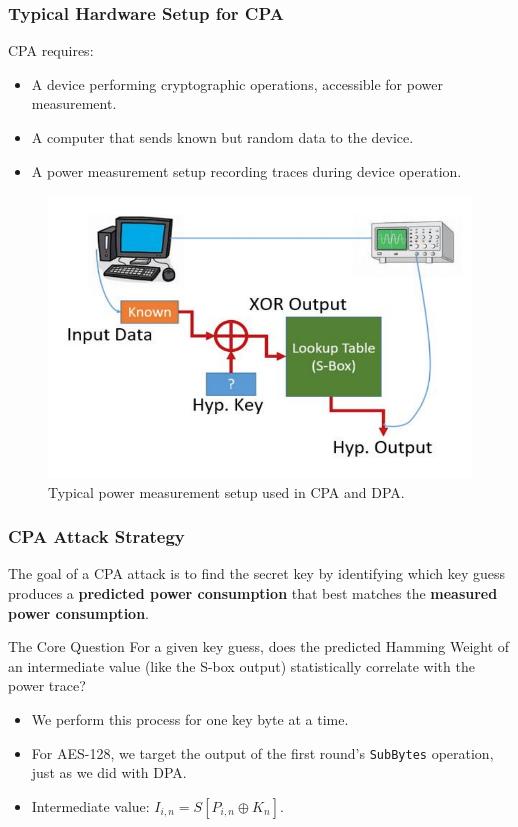 \begin{frame}
    \frametitle{Typical Hardware Setup for CPA}

    CPA requires:

    \begin{itemize}
        \item A device performing cryptographic operations, accessible for power measurement.
        \item A computer that sends known but random data to the device.
        \item A power measurement setup recording traces during device operation.
    \end{itemize}

    \begin{figure}
        \centering
        \includegraphics[width=0.7\linewidth]{main thing/Pictures/CPA_setup.png}
        \caption{Typical power measurement setup used in CPA and DPA.}
    \end{figure}
\end{frame}

\begin{frame}
    \frametitle{CPA Attack Strategy}

    The goal of a CPA attack is to find the secret key by identifying which key guess produces a \textbf{predicted power consumption} that best matches the \textbf{measured power consumption}.

    \begin{block}{The Core Question}
        For a given key guess, does the predicted Hamming Weight of an intermediate value (like the S-box output) statistically correlate with the power trace?
    \end{block}

    \begin{itemize}
        \item We perform this process for one key byte at a time.
        \item For AES-128, we target the output of the first round's \texttt{SubBytes} operation, just as we did with DPA.
        \item Intermediate value: $I_{i,n} = S[P_{i,n} \oplus K_n]$.
    \end{itemize}
\end{frame}

